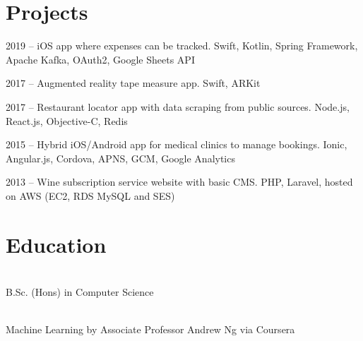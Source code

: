 {\begin{minipage}[t]{\leftcolwidth}
    \section*{Projects}

    \begin{description}[style=sameline,leftmargin=0pt]
        \item[\configprojectbudget] 2019 -- iOS app where expenses can be tracked. Swift, Kotlin, Spring Framework, Apache Kafka, OAuth2, Google Sheets API
        \item[\configprojectmeasure] 2017 -- Augmented reality tape measure app. Swift, ARKit
        \item[\configprojectrestaurant] 2017 -- Restaurant locator app with data scraping from public sources. Node.js, React.js, Objective-C, Redis
        \item[\configprojectclinics] 2015 -- Hybrid iOS/Android app for medical clinics to manage bookings. Ionic, Angular.js, Cordova, APNS, GCM, Google Analytics
        \item[\configprojectwine] 2013 -- Wine subscription service website with basic CMS. PHP, Laravel, hosted on AWS (EC2, RDS MySQL and SES)
    \end{description}

    \iffalse
    \section*{Publications}
    \configpublications
    \fi

\end{minipage}%
\hspace{\centerhpadding}%
\begin{minipage}[t]{\rightcolwidth}
    \raggedright
    
    \section*{Education}
    
    \begin{description}[style=sameline,leftmargin=0pt]
        \item[\configuniversity]
        \\
        B.Sc. (Hons) in Computer Science
        
        \item[Stanford University] \\
        Machine Learning by Associate Professor Andrew Ng via Coursera
        \iffalse
        \begin{itemize}
            \item Dissertation: {\configdissertation}
        \end{itemize}
        \fi
    \end{description}


\end{minipage}}
